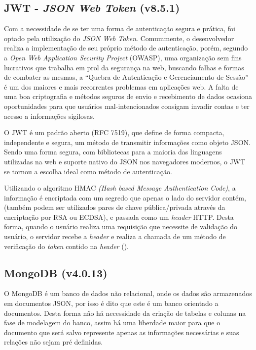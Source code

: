 \subsection{JWT - \textit{JSON Web Token} (v8.5.1) }

Com a necessidade de se ter uma forma de autenticação segura e prática, foi optado pela utilização do \textit{JSON Web Token}. Comummente, o desenvolvedor realiza a implementação de seu próprio método de autenticação, porém, segundo a \textit{Open Web Application Security Project} (OWASP), uma organização sem fins lucrativos que trabalha em prol da segurança na web, buscando falhas e formas de combater as mesmas, a “Quebra de Autenticação e Gerenciamento de Sessão” é um dos maiores e mais recorrentes problemas em aplicações web. A falta de uma boa criptografia e métodos seguros de envio e recebimento de dados ocasiona oportunidades para que usuários mal-intencionados consigam invadir contas e ter acesso a informações sigilosas.

O JWT é um padrão aberto (RFC 7519), que define de forma compacta, independente e segura, um método de transmitir informações como objeto JSON. Sendo uma forma segura, com bibliotecas para a maioria das linguagens utilizadas na web e suporte nativo do JSON nos navegadores modernos,  o JWT se tornou a escolha ideal como método de autenticação. 

Utilizando o algoritmo HMAC \textit{(Hash based Message Authentication Code)}, a informação é encriptada com um segredo que apenas o lado do servidor contém, (também podem ser utilizados pares de chave pública/privada através da encriptação por RSA ou ECDSA), e passada como um \textit{header} HTTP. Desta forma, quando o usuário realiza uma requisição que necessite de validação do usuário, o servidor recebe a \textit{header} e realiza a chamada de um método de verificação do \textit{token} contido na \textit{header} (\cite{jwt}).

\subsection{MongoDB (v4.0.13)}

O MongoDB é um banco de dados não relacional, onde os dados são armazenados em documentos JSON, por isso é dito que este é um banco orientado a documentos. Desta forma não há necessidade da criação de tabelas e colunas na fase de modelagem do banco, assim há uma liberdade maior para que o documento que será salvo represente apenas as informações necessárias e suas relações não sejam pré definidas.

